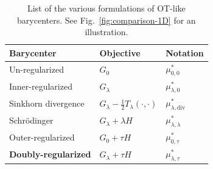 \documentclass[11pt]{article}
\newcommand{\rev}[1]{{#1}}
\begin{document}
\begin{table}
\centering
\begin{tabular}{l|l|l}
Barycenter & Objective  & Notation  \\
\hline
Un-regularized & $G_0$ &  $\mu_{0,0}^*$   \\
Inner-regularized &$G_\lambda$ & $\mu_{\lambda,0}^*$   \\
Sinkhorn divergence & $G_\lambda -\frac12 T_\lambda(\cdot,\cdot)$  &  $\mu_{\lambda,\mathrm{div}}^*$  \\
Schr\"odinger & $G_\lambda + \lambda H$ & $\mu^*_{\lambda,\lambda}$\\
Outer-regularized &$G_0 +\tau H$ &  $\mu_{0,\tau}^*$   \\
\textbf{Doubly-regularized} &$G_\lambda +\tau H$  & $\mu_{\lambda,\tau}^*$    \\
\hline
\end{tabular}
\caption{List of the various formulations of OT-like barycenters. %
See Fig.~\ref{fig:comparison-1D} for an illustration.
}\label{tab:comparison}
\end{table}
\end{document}
